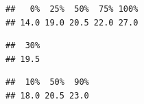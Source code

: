 \begin{frame}[fragile]

\small

\begin{knitrout}
\color{fgcolor}\begin{kframe}
\begin{alltt}
\hlopt{$}  \hlstd{=} \hlstd{)}
\end{alltt}
\begin{verbatim}
##   0%  25%  50%  75% 100% 
## 14.0 19.0 20.5 22.0 27.0
\end{verbatim}
\begin{alltt}
\hlopt{$} \hlstd{,}  \hlstd{=} \hlstd{)}
\end{alltt}
\begin{verbatim}
##  30% 
## 19.5
\end{verbatim}
\begin{alltt}
\hlopt{$} \hlstd{(}\hlstd{,} \hlstd{,} \hlstd{),}  \hlstd{=} \hlstd{)}
\end{alltt}
\begin{verbatim}
##  10%  50%  90% 
## 18.0 20.5 23.0
\end{verbatim}
\end{kframe}
\end{knitrout}

\end{frame}
%
%
%

